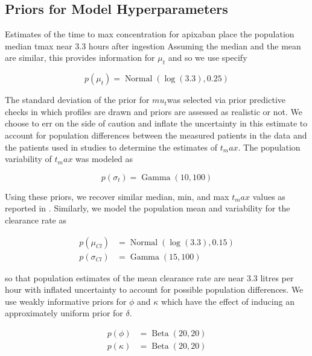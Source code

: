 \subsection*{Priors for Model Hyperparameters}

Estimates of the time to max concentration for apixaban place the population median tmax near 3.3 hours after ingestion \cite{Byon2019-gf} Assuming the median and the mean are similar, this provides information for $\mu_t$ and so we use specify 

\begin{equation}\label{eq:eq_10}
 p(\mu_t) = \operatorname{Normal}(\log(3.3), 0.25)
\end{equation}

The standard deviation of the prior for $mu_t$was selected via prior predictive checks in which profiles are drawn and priors are assessed as realistic or not.  We choose to err on the side of caution and inflate the uncertainty in this estimate to account for population differences between the measured patients in the data and the patients used in studies to determine the estimates of $t_max$. The population variability of $t_max$ was modeled as

\begin{equation}\label{eq:eq_11}
p(\sigma_t) = \operatorname{Gamma}(10,100)
\end{equation}

\noindent Using these priors, we recover similar median, min, and max $t_max$ values as reported in \cite{Byon2019-gf}. Similarly, we model the population mean and variability for the clearance rate as

\begin{align}
	p(\mu_{Cl}) &= \operatorname{Normal}(\log(3.3), 0.15) \label{eq:eq_12} \\
	p(\sigma_{Cl}) &= \operatorname{Gamma}(15, 100) \label{eq:eq_13}
\end{align}

\noindent so that population estimates of the mean clearance rate are near 3.3 litres per hour with inflated uncertainty to account for possible population differences. We use weakly informative priors for $\phi$ and $\kappa$ which have the effect of inducing an approximately uniform prior for $\delta$.

\begin{align}
	 p(\phi) &= \operatorname{Beta}(20,20) \label{eq:eq_14}\\
	 p(\kappa) &= \operatorname{Beta}(20,20)  \label{eq:eq_15}
\end{align}

